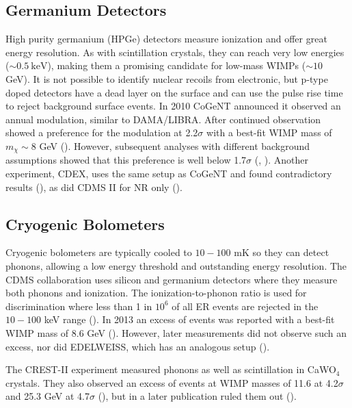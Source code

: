 \subsection{Germanium Detectors} \label{subsec:germanium}
High purity germanium (HPGe) detectors measure ionization and offer great energy resolution.  As with scintillation crystals,
they can reach very low energies ($\sim 0.5\ \mathrm{keV}$), making them a promising candidate for low-mass WIMPs ($\sim 10$ GeV).  It is not
possible to identify nuclear recoils from electronic, but p-type doped detectors have a dead layer on the surface and can use the
pulse rise time to reject background surface events.  In 2010 CoGeNT
announced it observed an annual modulation, similar to DAMA/LIBRA.  After continued observation showed a preference for the modulation
at 2.2$\sigma$ with a best-fit WIMP mass of $m_{\chi}\sim 8$ GeV ().  However, subsequent analyses with different
background assumptions showed that this preference is well below 1.7$\sigma$ (, ).  Another
experiment, CDEX, uses the same setup as CoGeNT and found contradictory results (), as did CDMS II for NR only
().


\subsection{Cryogenic Bolometers} \label{subsec:bolometers}
Cryogenic bolometers are typically cooled to $10-100$ mK so they can detect phonons, allowing a low energy threshold and
outstanding energy resolution.  The CDMS collaboration uses silicon and germanium detectors where they measure both phonons
and ionization.  The ionization-to-phonon ratio is used for discrimination where less than 1 in $10^{6}$ of all ER events
are rejected in the $10-100$ keV range ().  In 2013 an excess of events was reported with a best-fit
WIMP mass of 8.6 GeV ().  However, later measurements did not observe such an excess, nor did EDELWEISS,
which has an analogous setup ().

The CREST-II experiment measured phonons as well as scintillation in CaWO$_{4}$ crystals.  They also observed an excess of
events at WIMP masses of 11.6 at 4.2$\sigma$ and 25.3 GeV at 4.7$\sigma$ (), but in a later publication
ruled them out ().


